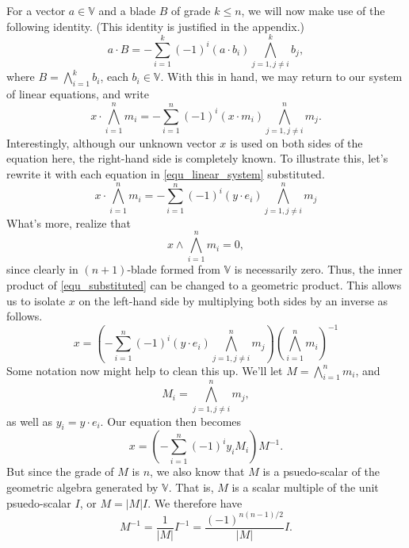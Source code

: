 \documentclass{birkjour}
\newcommand{\V}{\mathbb{V}}
\begin{document}
For a vector $a\in\V$ and a blade $B$ of grade $k\leq n$, we will now make use of the following identity.  (This identity is justified in the appendix.)
\begin{equation}\label{equ_useful_identity}
a\cdot B = -\sum_{i=1}^k(-1)^i (a\cdot b_i) \bigwedge_{j=1,j\neq i}^k b_j,
\end{equation}
where $B=\bigwedge_{i=1}^k b_i$, each $b_i\in\V$.  With this in hand, we may return to our
system of linear equations, and write
\begin{equation}
x\cdot\bigwedge_{i=1}^n m_i = -\sum_{i=1}^n (-1)^i (x\cdot m_i)\bigwedge_{j=1,j\neq i}^n m_j.
\end{equation}
Interestingly, although our unknown vector $x$ is used on both sides of the equation here, the right-hand side
is completely known.  To illustrate this, let's rewrite it with each equation in \eqref{equ_linear_system} substituted.
\begin{equation}\label{equ_substituted}
x\cdot\bigwedge_{i=1}^n m_i = -\sum_{i=1}^n (-1)^i (y\cdot e_i)\bigwedge_{j=1,j\neq i}^n m_j
\end{equation}
What's more, realize that
\begin{equation}
x\wedge\bigwedge_{i=1}^n m_i = 0,
\end{equation}
since clearly in $(n+1)$-blade formed from $\V$ is necessarily zero.  Thus, the inner product of \eqref{equ_substituted}
can be changed to a geometric product.  This allows us to isolate $x$ on the left-hand side by multiplying both sides
by an inverse as follows.
\begin{equation}
x = \left(-\sum_{i=1}^n (-1)^i (y\cdot e_i)\bigwedge_{j=1,j\neq i}^n m_j\right)\left(\bigwedge_{i=1}^n m_i\right)^{-1}
\end{equation}
Some notation now might help to clean this up.  We'll let $M=\bigwedge_{i=1}^n m_i$, and
\begin{equation}
M_i=\bigwedge_{j=1,j\neq i}^n m_j,
\end{equation}
as well as $y_i=y\cdot e_i$.  Our equation then becomes
\begin{equation}
x = \left(-\sum_{i=1}^n(-1)^i y_i M_i\right)M^{-1}.
\end{equation}
But since the grade of $M$ is $n$, we also know that $M$ is a psuedo-scalar of the geometric algebra generated by $\V$.
That is, $M$ is a scalar multiple of the unit psuedo-scalar $I$, or $M=|M|I$.  We therefore have
\begin{equation}
M^{-1} = \frac{1}{|M|}I^{-1} = \frac{(-1)^{n(n-1)/2}}{|M|}I.
\end{equation}
\end{document}
